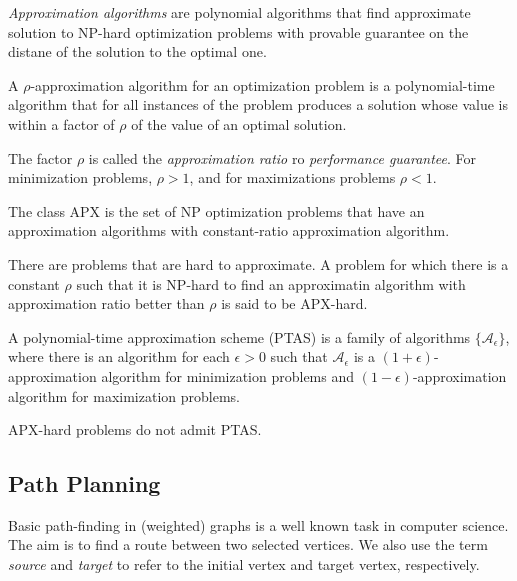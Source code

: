 \emph{Approximation algorithms} are polynomial algorithms that find approximate solution to NP-hard optimization problems with provable guarantee on the distane of the solution to the optimal one.
\begin{definition}\cite{williamson11}
A $\rho$-approximation algorithm for an optimization problem is a polynomial-time algorithm that for all instances of the problem produces a solution whose value is within a factor of
$\rho$ of the value of an optimal solution.
\end{definition}
The factor $\rho$ is called the \emph{approximation ratio} ro \emph{performance guarantee}.
For minimization problems, $\rho > 1$, and for maximizations problems $\rho < 1$.
\begin{definition}
The class APX is the set of NP optimization problems that have an approximation algorithms with constant-ratio approximation algorithm.
\end{definition}
There are problems that are hard to approximate. 
A problem for which there is a constant $\rho$ such that it is NP-hard to find an approximatin algorithm with approximation ratio better than $\rho$ is said to be APX-hard.
\begin{definition}\cite{williamson11}
A polynomial-time approximation scheme (PTAS) is a family of algorithms $\{\mathcal{A}_\epsilon\}$, where there is an algorithm for each $\epsilon > 0$ such that $\mathcal{A}_\epsilon$
is a $(1+\epsilon)$-approximation algorithm for minimization problems and $(1-\epsilon)$-approximation algorithm for maximization problems.
\end{definition}
\begin{claim}
APX-hard problems do not admit PTAS.
\end{claim}

\subsection{Path Planning}

Basic path-finding in (weighted) graphs is a well known task in computer science. The aim 
is to find a route between two selected vertices. We also use the term \emph{source} and
\emph{target} to refer to the initial vertex and target vertex, respectively.



